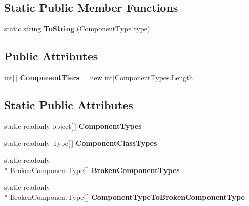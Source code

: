 \subsection*{Static Public Member Functions}
\begin{DoxyCompactItemize}
\item 
\hypertarget{class_skyrates_1_1_ship_1_1_ship_data_ae80bc8220acc0124bda0c77b4913ee58}{static string {\bfseries To\-String} (Component\-Type type)}\label{class_skyrates_1_1_ship_1_1_ship_data_ae80bc8220acc0124bda0c77b4913ee58}

\end{DoxyCompactItemize}
\subsection*{Public Attributes}
\begin{DoxyCompactItemize}
\item 
\hypertarget{class_skyrates_1_1_ship_1_1_ship_data_ac15ddb6a284005e04a258433f76214d4}{int\mbox{[}$\,$\mbox{]} {\bfseries Component\-Tiers} = new int\mbox{[}Component\-Types.\-Length\mbox{]}}\label{class_skyrates_1_1_ship_1_1_ship_data_ac15ddb6a284005e04a258433f76214d4}

\end{DoxyCompactItemize}
\subsection*{Static Public Attributes}
\begin{DoxyCompactItemize}
\item 
static readonly object\mbox{[}$\,$\mbox{]} {\bfseries Component\-Types}
\item 
static readonly Type\mbox{[}$\,$\mbox{]} {\bfseries Component\-Class\-Types}
\item 
static readonly \\*
Broken\-Component\-Type\mbox{[}$\,$\mbox{]} {\bfseries Broken\-Component\-Types}
\item 
static readonly \\*
Broken\-Component\-Type\mbox{[}$\,$\mbox{]} {\bfseries Component\-Type\-To\-Broken\-Component\-Type}
\end{DoxyCompactItemize}
